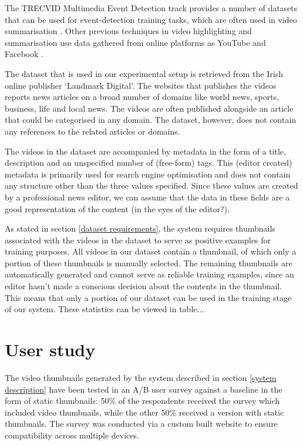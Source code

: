 \documentclass{../resources/sig-alternate-05-2015}
\begin{document}
The TRECVID Multimedia Event Detection track provides a number of datasets that can be used for event-detection training tasks, which are often used in video summarisation \cite{Ajmal:2012hi, Christel:2004in, Money:2008fn}. Other previous techniques in video highlighting and summarisation use data gathered from online platforms as YouTube and Facebook \cite{Yang:2015gi, Almeida:2012be}.

The dataset that is used in our experimental setup is retrieved from the Irish online publisher `Landmark Digital'. The websites that publishes the videos reports news articles on a broad number of domains like world news, sports, business, life and local news. The videos are often published alongside an article that could be categorised in any domain. The dataset, however, does not contain any references to the related articles or domains.

The videos in the dataset are accompanied by metadata in the form of a title, description and an unspecified number of (free-form) tags. This (editor created) metadata is primarily used for search engine optimisation and does not contain any structure other than the three values specified. Since these values are created by a professional news editor, we can assume that the data in these fields are a good representation of the content (in the eyes of the editor?).

As stated in section \ref{dataset requirements}, the system requires thumbnails associated with the videos in the dataset to serve as positive examples for training purposes. All videos in our dataset contain a thumbnail, of which only a portion of these thumbnails is manually selected. The remaining thumbnails are automatically generated and cannot serve as reliable training examples, since an editor hasn't made a conscious decision about the contents in the thumbnail. This means that only a portion of our dataset can be used in the training stage of our system. These statistics can be viewed in table...


\section{User study}
\label{user study}

The video thumbnails generated by the system described in section \ref{system description} have been tested in an A/B user survey against a baseline in the form of static thumbnails: 50\% of the respondents received the survey which included video thumbnails, while the other 50\% received a version with static thumbnails. The survey was conducted via a custom built website to ensure compatibility across multiple devices.
\end{document}
